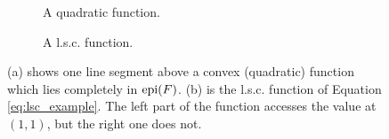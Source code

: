     \begin{figure}[ht]
        \centering
        \begin{subfigure}[b]{0.4\textwidth}
        \caption{A quadratic function.}
        \end{subfigure}
        \begin{subfigure}[b]{0.4\textwidth}
        \caption{A l.s.c. function.}
        \end{subfigure}
        \caption{(a) shows one line segment above a convex (quadratic) function which lies completely in $\textnormal{epi}(F)$. (b) is the l.s.c. function of Equation \ref{eq:lsc_example}. The left part of the function accesses the value at $(1, 1)$, but the right one does not.}
        \label{fig:convex_function}
    \end{figure}

